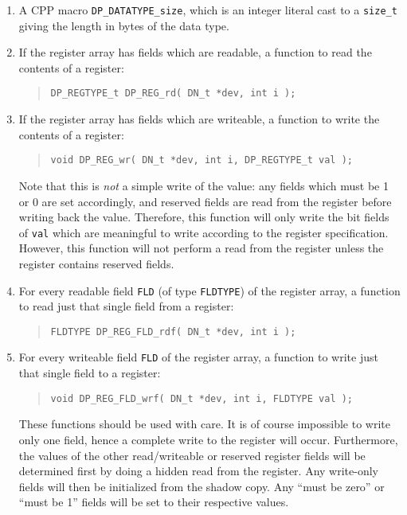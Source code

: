 \documentclass[a4paper,11pt,twoside]{report}
\begin{document}
\begin{enumerate}

\item A CPP macro \texttt{DP\_DATATYPE\_size}, which is an integer
  literal cast to a \texttt{size\_t} giving the length in bytes of the
  data type. 

\item If the register array has fields which are readable, a function to
  read the contents of a register:
  \begin{quote}
    \texttt{DP\_REGTYPE\_t DP\_REG\_rd( DN\_t *dev, int i );}
  \end{quote}

\item If the register array has fields which are writeable, a function to
  write the contents of a register:
  \begin{quote}
    \texttt{void DP\_REG\_wr( DN\_t *dev, int i, DP\_REGTYPE\_t val );}
  \end{quote}
  Note that this is \emph{not} a simple write of the value: any fields
  which must be 1 or 0 are set accordingly, and reserved fields are
  read from the register before writing back the value.  Therefore,
  this function will only write the bit fields of \texttt{val} which
  are meaningful to write according to the register specification.
  However, this function will not perform a read from the register
  unless the register contains reserved fields. 

\item For every readable field \texttt{FLD} (of type \texttt{FLDTYPE})
  of the register array, a function to read just that single field
  from a register: 
  \begin{quote}
    \texttt{FLDTYPE DP\_REG\_FLD\_rdf( DN\_t *dev, int i );}
  \end{quote}

\item For every writeable field \texttt{FLD} of the register array, a
  function to write just that single field to a register:
  \begin{quote}
    \texttt{void DP\_REG\_FLD\_wrf( DN\_t *dev, int i, \texttt{FLDTYPE} val );}
  \end{quote}
  
  These functions should be used with care.  It is of
  course impossible to write only one field, hence a complete write to
  the register will occur.  Furthermore, the values of the other
  read/writeable or reserved register fields will be determined first
  by doing a hidden read from the register.   Any write-only 
  fields will then be initialized from the shadow copy.  Any ``must be
  zero'' or ``must be 1'' fields will be set to their respective values.  


\end{enumerate}
\end{document}
